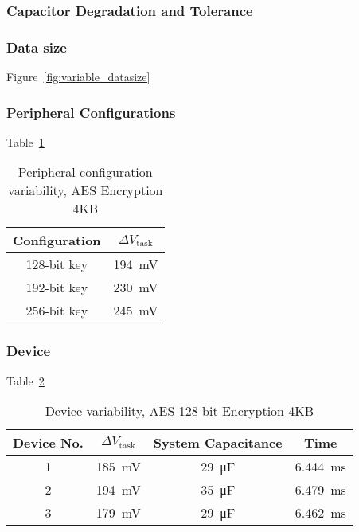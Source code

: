 \subsubsection{Capacitor Degradation and Tolerance}

\subsubsection{Data size}




Figure~\ref{fig:variable_datasize}

\subsubsection{Peripheral Configurations}

Table~\ref{tab:configurations}

\begin{table}[!t]
    \renewcommand{\arraystretch}{1.2}
    \centering
    \caption{Peripheral configuration variability, AES Encryption 4KB}
    \label{tab:configurations}
    \begin{tabular}{|c|c|}
    \hline
    \textbf{Configuration} & \textbf{$\Delta V_{\text{task}}$}\\
    \hline
    128-bit key & \SI{194}{\milli\volt}\\
    192-bit key & \SI{230}{\milli\volt}\\
    256-bit key & \SI{245}{\milli\volt}\\
    \hline
    \end{tabular}
\end{table}

\subsubsection{Device}

Table~\ref{tab:device}

\begin{table}[!t]
    \renewcommand{\arraystretch}{1.2}
    \centering
    \caption{Device variability, AES 128-bit Encryption 4KB}
    \label{tab:device}
    \begin{tabular}{|c|c|c|c|}
    \hline
    \textbf{Device No.} & \textbf{$\Delta V_{\text{task}}$} & \textbf{System Capacitance} & \textbf{Time} \\
    \hline
    1 & \SI{185}{\milli\volt} & \SI{29}{\micro\farad} & \SI{6.444}{\milli\second} \\
    2 & \SI{194}{\milli\volt} & \SI{35}{\micro\farad} & \SI{6.479}{\milli\second} \\
    3 & \SI{179}{\milli\volt} & \SI{29}{\micro\farad} & \SI{6.462}{\milli\second} \\
    \hline
    \end{tabular}
\end{table}

